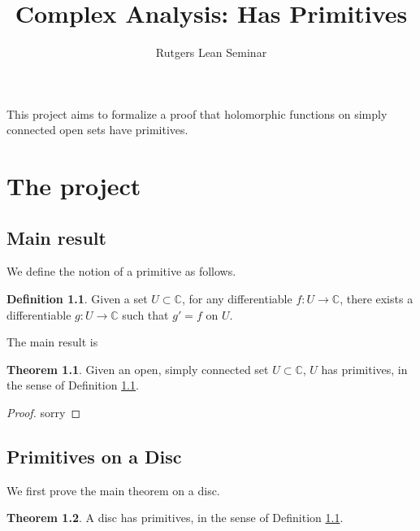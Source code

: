 \documentclass{report}
\title{Complex Analysis: Has Primitives}
\author{Rutgers Lean Seminar}
\theoremstyle{definition}
\newtheorem{definition}{Definition}
\newtheorem{theorem}{Theorem}
\begin{document}
\maketitle

This project aims to formalize a proof that holomorphic functions on simply connected open sets have primitives.

\chapter{The project}

\section{Main result}


We define the notion of a primitive as follows.

\begin{definition}
  \label{HasPrimitives}
  \leanok
  Given a set $U\subset\mathbb C$, for any differentiable $f:U\to\mathbb C$, there exists a differentiable $g:U\to\mathbb C$ such that $g'=f$ on $U$.
\end{definition}

The main result is

\begin{theorem}
  \label{hasPrimitives_of_simplyConnected}
  \leanok
  Given an open, simply connected set $U\subset\mathbb C$, $U$ has primitives, in the sense of Definition \ref{HasPrimitives}.
\end{theorem}

\begin{proof}
  sorry
\end{proof}

\section{Primitives on a Disc}
We first prove the main theorem on a disc.

\begin{theorem}
  \label{hasPrimitives_of_disc}
  \leanok
  A disc has primitives, in the sense of Definition \ref{HasPrimitives}.
\end{theorem}
\end{document}
